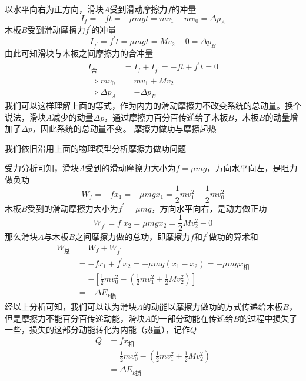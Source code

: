{\fangsong 以水平向右为正方向，滑块\(A\)受到滑动摩擦力\(f\)的冲量
\[I_f =- ft =-\mu mgt = mv_1 - mv_0 =\Delta p_A\]
木板\(B\)受到滑动摩擦力\(f^\prime\)的冲量
\[I_{f^\prime} =f^\prime t =\mu mgt = Mv_2 - 0 =\Delta p_B\]
由此可知滑块与木板之间摩擦力的合冲量
\[\begin{aligned}
	I_\text{合}&= I_f + I_{f^\prime}=-ft + f^\prime t= 0 \\
	\Rightarrow mv_0&= mv_1 + Mv_2\\
	\Rightarrow \Delta p_A &=-\Delta p_B
\end{aligned}\]
我们可以这样理解上面的等式，作为内力的滑动摩擦力不改变系统的总动量。换个说法，滑块\(A\)减少的动量\(\Delta p\)，通过摩擦力百分百传递给了木板\(B\)，木板\(B\)的动量增加了\(\Delta p\)，因此系统的总动量不变。
}
摩擦力做功与摩擦起热

 我们依旧沿用上面的物理模型分析摩擦力做功问题

{\fangsong 受力分析可知，滑块\(A\)受到的滑动摩擦力大小为\(f =\mu mg\)，方向水平向左，是阻力做负功
\[W_f = -fx_1 =-\mu mgx_1 = \frac{1}{2}mv_1^2 - \frac{1}{2}mv_0^2\]
木板\(B\)受到的滑动摩擦力大小为\(f^\prime=\mu mg\)，方向水平向右，是动力做正功
\[W_{f^\prime}= f^\prime x_2 =\mu mgx_2 = \frac{1}{2}Mv_2^2 - 0\]
那么滑块\(A\)与木板\(B\)之间摩擦力做的总功，即摩擦力\(f\)和\(f^\prime\)做功的算术和
\[\begin{aligned}
	W_\text{总} &= W_f + W_{f^\prime}\\
	&=- fx_1 + f^\prime x_2 =-\mu mg(x_1 - x_2) =-\mu mgx_\text{相}\\
	&=-[\frac{1}{2}mv_0^2 - (\frac{1}{2}mv_1^2 + \frac{1}{2}Mv_2^2)]\\
	&=-\Delta E_{k\text{损}}
\end{aligned}\]
经以上分析可知，我们可以认为滑块\(A\)的动能以摩擦力做功的方式传递给木板\(B\)，但是摩擦力不能百分百传递动能，滑块\(A\)的一部分动能在传递给\(B\)的过程中损失了一些，损失的这部分动能转化为内能（热量），记作\(Q\)
\[\begin{aligned}Q &= fx_\text{相}\\
	&=\frac{1}{2}mv_0^2 - (\frac{1}{2}mv_1^2 + \frac{1}{2}Mv_2^2)\\
	&=\Delta E_{k\text{损}}
\end{aligned}\]
}